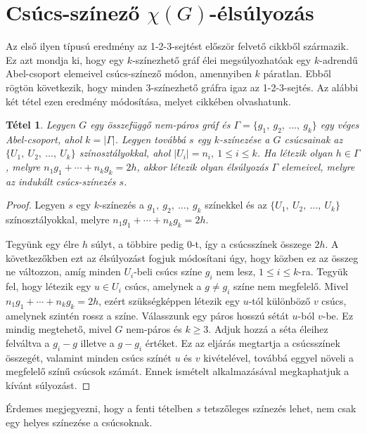 \documentclass[12pt, a4paper]{report}
\newtheorem{tét}{Tétel}[section]
\theoremstyle{remark}
\theoremstyle{definition}
\begin{document}
\section{Csúcs-színező $χ(G)$-élsúlyozás}
Az első ilyen típusú eredmény az 1-2-3-sejtést először felvető cikkből \cite{Karonski2004} származik. Ez azt mondja ki, hogy egy $k$-színezhető gráf élei megsúlyozhatóak egy $k$-adrendű Abel-csoport elemeivel csúcs-színező módon, amennyiben $k$ páratlan. Ebből rögtön következik, hogy minden $3$-színezhető gráfra igaz az 1-2-3-sejtés. Az alábbi két tétel ezen eredmény módosítása, melyet \citeauthor{Lu2011} \cite{Lu2011} cikkében olvashatunk.

\begin{tét}
Legyen $G$ egy összefüggő nem-páros gráf és $\Gamma = \lbrace g_1,\ g_2,\ \ldots,\ g_k \rbrace$ egy véges Abel-csoport, ahol $k = |\Gamma|$. Legyen továbbá $s$ egy $k$-színezése a $G$ csúcsainak az $\lbrace U_1,\ U_2,\ \ldots,\ U_k \rbrace$  színosztályokkal, ahol $|U_i| = n_i,\ 1 \leq i \leq k$. Ha létezik olyan $h \in \Gamma$, melyre $n_1 g_1 + \cdots + n_k g_k = 2h$, akkor létezik olyan élsúlyozás $\Gamma$ elemeivel, melyre az indukált csúcs-színezés $s$.
\end{tét}

\begin{proof}
Legyen $s$ egy $k$-színezés a $g_1,\ g_2,\ \ldots,\ g_k$ színekkel és az $\lbrace U_1,\ U_2,\ \ldots,\ U_k \rbrace$ színosztályokkal, melyre $n_1 g_1 + \cdots + n_k g_k = 2h$.

Tegyünk egy élre $h$ súlyt, a többire pedig $0$-t, így a csúcsszínek összege $2h$. A következőkben ezt az élsúlyozást fogjuk módosítani úgy, hogy közben ez az összeg ne változzon, amíg minden $U_i$-beli csúcs színe $g_i$ nem lesz, $1 \leq i \leq k$-ra. Tegyük fel, hogy létezik egy $u \in U_i$ csúcs, amelynek a $g \neq g_i$ színe nem megfelelő. Mivel $n_1 g_1 + \cdots + n_k g_k = 2h$, ezért szükségképpen létezik egy $u$-tól különböző $v$ csúcs, amelynek szintén rossz a színe. Válasszunk egy páros hosszú sétát $u$-ból $v$-be. Ez mindig megtehető, mivel $G$ nem-páros és $k \geq 3$. Adjuk hozzá a séta éleihez felváltva a $g_i - g$ illetve a $g - g_i$ értéket. Ez az eljárás megtartja a csúcsszínek összegét, valamint minden csúcs színét $u$ és $v$ kivételével, továbbá eggyel növeli a megfelelő színű csúcsok számát. Ennek ismételt alkalmazásával megkaphatjuk a kívánt súlyozást.
\end{proof}

Érdemes megjegyezni, hogy a fenti tételben $s$ tetszőleges színezés lehet, nem csak egy helyes színezése a csúcsoknak.
\end{document}
